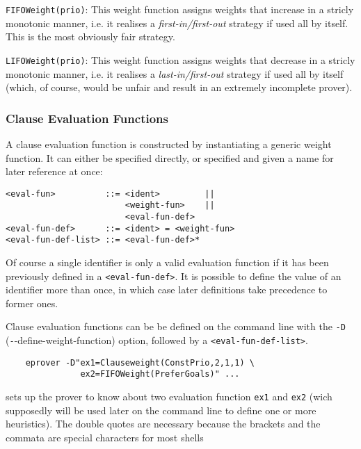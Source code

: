\documentclass{article}
\begin{document}
\medskip
\begin{sloppypar}
\noindent{}\texttt{FIFOWeight(prio)}:
This weight function assigns weights that increase in a stricly
monotonic manner, i.e. it realises a \emph{first-in/first-out}
strategy if used all by itself. This is the most obviously fair
strategy.
\end{sloppypar}

\medskip
\begin{sloppypar}
\noindent{}\texttt{LIFOWeight(prio)}:
This weight function assigns weights that decrease in a stricly
monotonic manner, i.e. it realises a \emph{last-in/first-out}
strategy if used all by itself (which, of course, would be unfair and
result in an extremely incomplete prover).
\end{sloppypar}


\subsubsection{Clause Evaluation Functions}

A clause evaluation function is constructed by instantiating a generic
weight function. It can either be specified directly, or specified and
given a name for later reference at once:

\begin{verbatim}
<eval-fun>          ::= <ident>         ||
                        <weight-fun>    ||
                        <eval-fun-def>  
<eval-fun-def>      ::= <ident> = <weight-fun>
<eval-fun-def-list> ::= <eval-fun-def>*
\end{verbatim}

Of course a single identifier is only a valid evaluation function if
it has been previously defined in a \texttt{<eval-fun-def>}. It is
possible to define the value of an identifier more than once, in which
case later definitions take precedence to former ones.

Clause evaluation functions can be be defined on the command line with
the \texttt{-D} (\texttt--{define-weight-function}) option, followed
by a \texttt{<eval-fun-def-list>}.

\begin{example}
\begin{verbatim}
    eprover -D"ex1=Clauseweight(ConstPrio,2,1,1) \
               ex2=FIFOWeight(PreferGoals)" ...
\end{verbatim}
  sets up the prover to know about two evaluation function
  \texttt{ex1} and \texttt{ex2} (wich supposedly will be used later on
  the command line to define one or more heuristics). The double
  quotes are necessary because the brackets and the commata are
  special characters for most shells
\end{example}
\end{document}

